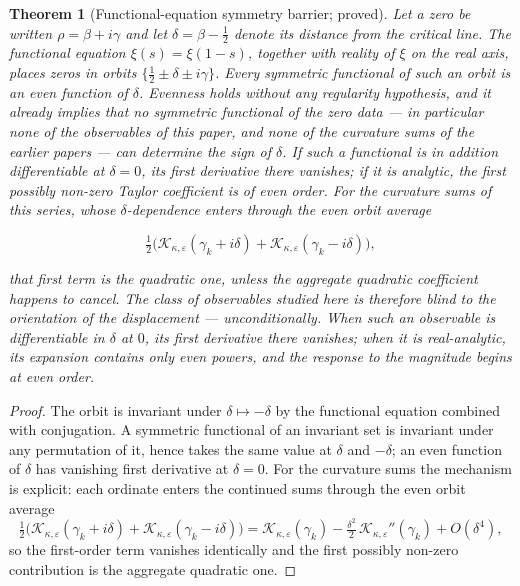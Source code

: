 \documentclass[11pt]{article}
\newtheorem{theorem}{Theorem}[section]
\begin{document}
\begin{theorem}[Functional-equation symmetry barrier; proved]
\label{thm:barrier}
Let a zero be written $\rho=\beta+i\gamma$ and let $\delta=\beta-\tfrac12$
denote its distance from the critical line. The functional equation
$\xi(s)=\xi(1-s)$, together with reality of $\xi$ on the real axis, places
zeros in orbits $\{\tfrac12\pm\delta\pm i\gamma\}$. Every symmetric functional
of such an orbit is an even function of $\delta$. Evenness holds without any
regularity hypothesis, and it already implies that no symmetric functional of
the zero data --- in particular none of the observables of this paper, and
none of the curvature sums of the earlier papers --- can determine the
\emph{sign} of $\delta$. If such a functional is in addition differentiable at
$\delta=0$, its first derivative there vanishes; if it is analytic, the first
possibly non-zero Taylor coefficient is of even order. For the curvature sums
of this series, whose $\delta$-dependence enters through the even orbit
average

\[
\tfrac12\bigl(\mathcal K_{\kappa,\varepsilon}(\gamma_k+i\delta)
+\mathcal K_{\kappa,\varepsilon}(\gamma_k-i\delta)\bigr),
\]

that first term is the quadratic one, unless the aggregate quadratic
coefficient happens to cancel. The class of observables studied here is
therefore blind to the orientation of the displacement ---
unconditionally. When such an observable is differentiable in $\delta$
at $0$, its first derivative there vanishes; when it is real-analytic, its
expansion contains only even powers, and the response to the magnitude
begins at even order.
\end{theorem}

\begin{proof}
The orbit is invariant under $\delta\mapsto-\delta$ by the functional
equation combined with conjugation. A symmetric functional of an
invariant set is invariant under any permutation of it, hence takes the same
value at $\delta$ and $-\delta$; an even function of $\delta$ has vanishing
first derivative at $\delta=0$. For the curvature sums the mechanism is
explicit: each ordinate enters the continued sums through the even orbit
average
\[
\tfrac12\bigl(\mathcal K_{\kappa,\varepsilon}(\gamma_k+i\delta)
+\mathcal K_{\kappa,\varepsilon}(\gamma_k-i\delta)\bigr)
=\mathcal K_{\kappa,\varepsilon}(\gamma_k)
-\tfrac{\delta^2}{2}\,\mathcal K_{\kappa,\varepsilon}''(\gamma_k)
+O(\delta^4),
\]
so the first-order term vanishes identically and the first possibly non-zero
contribution is the aggregate quadratic one.
\end{proof}
\end{document}

